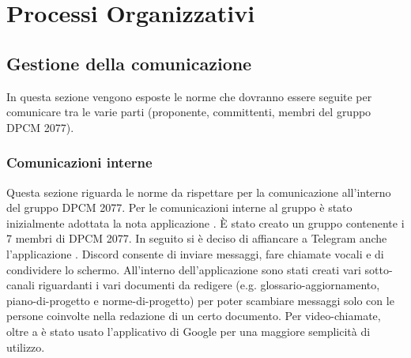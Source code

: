 \section{Processi Organizzativi}

\subsection{Gestione della comunicazione}
In questa sezione vengono esposte le norme che dovranno essere seguite per comunicare tra le varie parti (proponente,  committenti,  membri  del  gruppo DPCM 2077).
\subsubsection{Comunicazioni interne}

Questa sezione riguarda le norme da rispettare per la comunicazione all'interno del gruppo DPCM 2077. Per le comunicazioni interne al gruppo è stato inizialmente adottata la nota applicazione .
È stato creato un gruppo contenente i 7 membri di DPCM 2077.
In seguito si è deciso di affiancare a Telegram anche l'applicazione .
Discord consente di inviare messaggi, fare chiamate vocali e di condividere lo schermo.
All'interno dell'applicazione sono stati creati vari sotto-canali riguardanti i vari documenti da redigere (e.g. glossario-aggiornamento, piano-di-progetto e norme-di-progetto)
per poter scambiare messaggi solo con le persone coinvolte nella redazione di un certo documento.
Per video-chiamate, oltre a  è stato usato l'applicativo  di Google per una maggiore semplicità di utilizzo.

